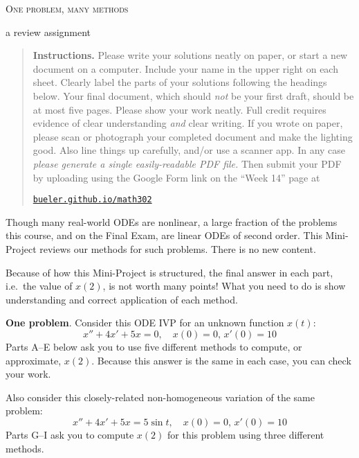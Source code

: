 \documentclass[12pt]{article}
\theoremstyle{definition}
\begin{document}
\renewcommand{\d}{\displaystyle}

\strut
\centerline{{\Large \textsc{One problem, many methods}}}

\medskip
\centerline{{\large a review assignment}}

\medskip
\small
\renewcommand{\baselinestretch}{0.95}
\begin{quote}
\textbf{Instructions.}  Please write your solutions neatly on paper, or start a new document on a computer.  Include your name in the upper right on each sheet.  Clearly label the parts of your solutions following the headings below.    Your final document, which should \emph{not} be your first draft, should be at most five pages.  Please show your work neatly.  Full credit requires evidence of clear understanding \emph{and} clear writing.  If you wrote on paper, please scan or photograph your completed document and make the lighting good.  Also line things up carefully, and/or use a scanner app.  In any case \emph{please generate a single easily-readable PDF file.}  Then submit your PDF by uploading using the Google Form link on the ``Week 14'' page at

     \centerline{\href{https://bueler.github.io/math302/index.html}{\texttt{bueler.github.io/math302}}}  
\end{quote}

\normalsize
\bigskip
\renewcommand{\baselinestretch}{1.1}

Though many real-world ODEs are nonlinear, a large fraction of the problems this course, and on the Final Exam, are linear ODEs of second order.  This Mini-Project reviews our methods for such problems.  There is no new content.

Because of how this Mini-Project is structured, the final answer in each part, i.e.~the value of $x(2)$, is not worth many points!  What you need to do is show understanding and correct application of each method.

\medskip
\textbf{One problem}.  Consider this ODE IVP for an unknown function $x(t)$:
\begin{equation}
x''+4x'+5x=0, \quad x(0)=0, \, x'(0)=10 \label{homo}
\end{equation}
Parts A--E below ask you to use five different methods to compute, or approximate, $x(2)$.  Because this answer is the same in each case, you can check your work.

Also consider this closely-related non-homogeneous variation of the same problem:
\begin{equation}
x''+4x'+5x=5\sin t, \quad x(0)=0, \, x'(0)=10 \label{nonhomo}
\end{equation}
Parts G--I ask you to compute $x(2)$ for this problem using three different methods.
\end{document}
